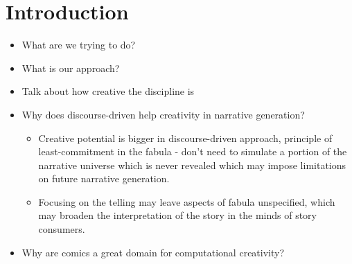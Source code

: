 \section{Introduction}

\begin{itemize}

	\item What are we trying to do?
	\item What is our approach?
	\item Talk about how creative the discipline is
	\item Why does discourse-driven help creativity in narrative generation?
		\begin{itemize}
			\item Creative potential is bigger in discourse-driven approach, principle 
			of least-commitment in the fabula - don't need to simulate a portion of 
			the narrative universe which is never revealed which may impose limitations
			on future narrative generation. 
			
			\item Focusing on the telling may leave aspects of fabula unspecified, which 
			may broaden the interpretation of the story in the minds of story consumers. 
		\end{itemize}
	\item Why are comics a great domain for computational creativity?


\end{itemize}